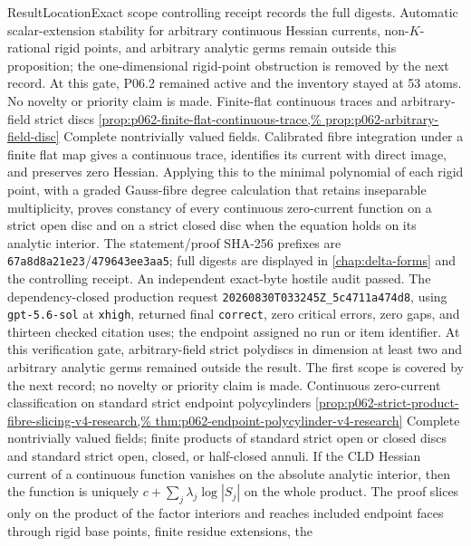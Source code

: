 \begin{AppLProvenanceLedger}{Result}{Location}{Exact scope}
{   controlling receipt records the full digests.
   Automatic scalar-extension stability for arbitrary continuous Hessian
   currents, non-\(K\)-rational rigid points, and arbitrary analytic germs
   remain outside this proposition; the one-dimensional rigid-point
   obstruction is removed by the next record. At this gate, P06.2 remained
   active and the inventory stayed at 53 atoms. No novelty or priority
   claim is made.}
\AppLProvenanceRecord
  {Finite-flat continuous traces and arbitrary-field strict discs}
  {\cref{prop:p062-finite-flat-continuous-trace,%
   prop:p062-arbitrary-field-disc}}
  {Complete nontrivially valued fields.  Calibrated fibre integration under
   a finite flat map gives a continuous trace, identifies its current with
   direct image, and preserves zero Hessian.  Applying this to the minimal
   polynomial of each rigid point, with a graded Gauss-fibre degree
   calculation that retains inseparable multiplicity, proves constancy of
   every continuous zero-current function on a strict open disc and on a
   strict closed disc when the equation holds on its analytic interior.
   The statement/proof SHA-256 prefixes are
   \texttt{67a8d8a21e23}/\texttt{479643ee3aa5}; full digests are displayed
   in \cref{chap:delta-forms} and the controlling receipt.  An independent
   exact-byte
   hostile audit passed.  The dependency-closed production request
   \nolinkurl{20260830T033245Z_5c4711a474d8}, using
   \texttt{gpt-5.6-sol} at \texttt{xhigh}, returned final
   \texttt{correct}, zero critical errors, zero gaps, and thirteen checked
   citation uses; the endpoint assigned no run or item identifier.
   At this verification gate, arbitrary-field strict polydiscs in dimension
   at least two and arbitrary analytic germs remained outside the result.
   The first scope is covered by the next record; no novelty or priority
   claim is made.}
\AppLProvenanceRecord
  {Continuous zero-current classification on standard strict endpoint
   polycylinders}
  {\cref{prop:p062-strict-product-fibre-slicing-v4-research,%
   thm:p062-endpoint-polycylinder-v4-research}}
  {Complete nontrivially valued fields; finite products of standard strict
   open or closed discs and standard strict open, closed, or half-closed
   annuli.  If the CLD Hessian current of a continuous function vanishes on
   the absolute analytic interior, then the function is uniquely
   \(c+\sum_j\lambda_j\log|S_j|\) on the whole product.  The proof slices
   only on the product of the factor interiors and reaches included endpoint
   faces through rigid base points, finite residue extensions, the
}
\end{AppLProvenanceLedger}
